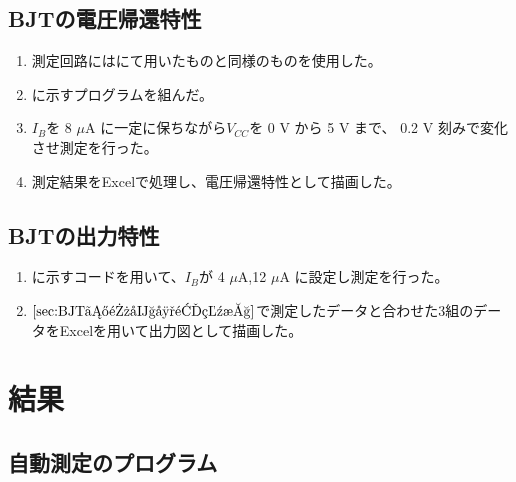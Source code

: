 \documentclass[11pt,dvipdfmx]{jarticle}
\begin{document}
	\subsection{BJTの電圧帰還特性}
	\label{sec:BJTの電圧帰還特性}
	\begin{enumerate}
		\item 測定回路にはにて用いたものと同様のものを使用した。
		\item {}に示すプログラムを組んだ。
		\item $I_B$を 8 $\mu$A に一定に保ちながら$V_{CC}$を 0 V から 5 V まで、 0.2 V 刻みで変化させ測定を行った。
		\item 測定結果をExcelで処理し、電圧帰還特性として描画した。
	\end{enumerate}
	\subsection{BJTの出力特性}
	\begin{enumerate}
		\item {}に示すコードを用いて、$I_B$が 4 $\mu$A,12 $\mu$A に設定し測定を行った。
		\item $\wsec{BJTの電圧帰還特性}$で測定したデータと合わせた3組のデータをExcelを用いて出力図として描画した。
	\end{enumerate}
\section{結果}
	\subsection{自動測定のプログラム}
\end{document}
